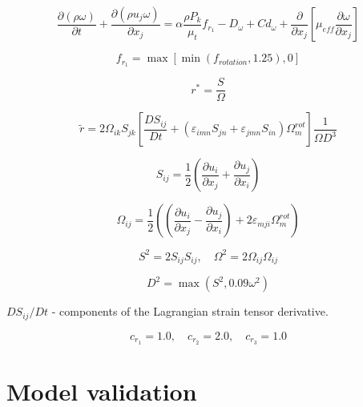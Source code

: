 \documentclass[a4paper]{jpconf}
\begin{document}
\begin{figure}[h]
\begin{minipage}{20pc}
\begin{equation}
\frac{\partial (\rho \omega)}{\partial t} + \frac{\partial (\rho u_j \omega)}{\partial x_j} = \alpha \frac{\rho P_k}{\mu_t}f_{r_1}  - D_{\omega} + Cd_{\omega} + \frac{\partial}{\partial x_j} \left[ \mu_{eff}\frac{\partial \omega}{\partial x_j} \right]
\end{equation}

\begin{equation}
f_{r_1} = \max\left[ \min(f_{rotation}, 1.25), 0 \right]
\end{equation}

\begin{equation}
r^*=\frac{S}{\Omega}
\end{equation}

\end{minipage}
\end{figure}
\begin{equation}
\tilde{r} = 2\Omega_{ik}S_{jk}\left[ \frac{DS_{ij}}{Dt} + \left( \varepsilon_{imn}S_{jn} + \varepsilon_{jmn}S_{in} \right)\Omega^{rot}_m \right]\frac{1}{\Omega D^3}
\end{equation}

 \begin{equation}
 S_{ij} = \frac{1}{2}\left( \frac{\partial u_i}{\partial x_j} + \frac{\partial u_j}{\partial x_i} \right)
 \end{equation}

\begin{equation}
\Omega_{ij} = \frac{1}{2}\left( \left( \frac{\partial u_i}{\partial x_j} - \frac{\partial u_j}{\partial x_i}  \right) +2\varepsilon_{mji} \Omega^{rot}_m \right)
\end{equation}

\begin{equation}
S^2 = 2S_{ij}S_{ij}, \quad 
\Omega^2 = 2\Omega_{ij}\Omega_{ij}
\end{equation}

\begin{equation}
D^2 = \max(S^2, 0.09\omega^2)
\end{equation}

$DS_{ij}/Dt$ - components of the Lagrangian strain tensor derivative.

$$
c_{r_1} = 1.0, \quad c_{r_2} = 2.0, \quad c_{r_3} = 1.0
$$


\section{Model validation}
\end{document}
